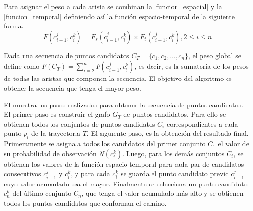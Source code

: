 Para asignar el peso a cada arista se combinan la \cref{funcion_espacial} y la \cref{funcion_temporal} definiendo así la función espacio-temporal de la siguiente forma:
\begin{equation} \label{funcion_espacio_temporal}
F(c_{i-1}^{j},c_{i}^{k}) = F_s(c_{i-1}^{j},c_{i}^{k}) \times F_{ t }(c_{ i-1 }^{ j },c_{ i }^{ k }), 2 \leq i \leq n
\end{equation}

Dada una secuencia de puntos candidatos $C_T = \{c_1, c_2, \dots, c_n\}$, el peso global se define como $F(C_T) = \sum _{ i=2 }^{ n }{F(c_{i-1}^{j},c_{i}^{k})}$, es decir, es la sumatoria de los pesos de todas las aristas que componen la secuencia. El objetivo del algoritmo es obtener la secuencia que tenga el mayor peso.

El  muestra los pasos realizados para obtener la secuencia de puntos candidatos. El primer paso es construir el grafo $G_T$ de puntos candidatos. Para ello se obtienen todos los conjuntos de puntos candidatos $C_i$ correspondientes a cada punto $p_i$ de la trayectoria $T$. El siguiente paso, es la obtención del resultado final. Primeramente se asigna a todos los candidatos del primer conjunto $C_1$ el valor de su probabilidad de observación $N(c_i^k)$. Luego, para los demás conjuntos $C_i$, se obtienen los valores de la función espacio-temporal para cada par de candidatos consecutivos $c_{i-1}^j$ y $c_i^k$, y para cada $c_i^k$ se guarda el punto candidato previo $c_{i-1}^j$ cuyo valor acumulado sea el mayor. Finalmente se selecciona un punto candidato $c_n^k$ del último conjunto $C_n$, que tenga el valor acumulado más alto y se obtienen todos los puntos candidatos que conforman el camino.

